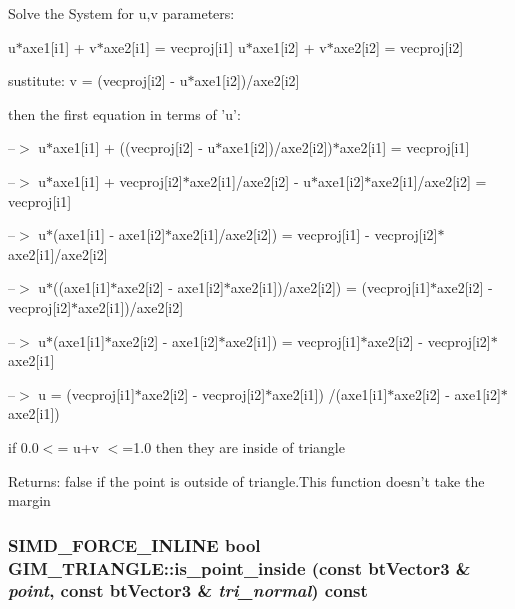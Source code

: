 Solve the System for u,v parameters:

u$\ast$axe1\mbox{[}i1\mbox{]} + v$\ast$axe2\mbox{[}i1\mbox{]} = vecproj\mbox{[}i1\mbox{]} u$\ast$axe1\mbox{[}i2\mbox{]} + v$\ast$axe2\mbox{[}i2\mbox{]} = vecproj\mbox{[}i2\mbox{]}

sustitute: v = (vecproj\mbox{[}i2\mbox{]} - u$\ast$axe1\mbox{[}i2\mbox{]})/axe2\mbox{[}i2\mbox{]}

then the first equation in terms of 'u':

--$>$ u$\ast$axe1\mbox{[}i1\mbox{]} + ((vecproj\mbox{[}i2\mbox{]} - u$\ast$axe1\mbox{[}i2\mbox{]})/axe2\mbox{[}i2\mbox{]})$\ast$axe2\mbox{[}i1\mbox{]} = vecproj\mbox{[}i1\mbox{]}

--$>$ u$\ast$axe1\mbox{[}i1\mbox{]} + vecproj\mbox{[}i2\mbox{]}$\ast$axe2\mbox{[}i1\mbox{]}/axe2\mbox{[}i2\mbox{]} - u$\ast$axe1\mbox{[}i2\mbox{]}$\ast$axe2\mbox{[}i1\mbox{]}/axe2\mbox{[}i2\mbox{]} = vecproj\mbox{[}i1\mbox{]}

--$>$ u$\ast$(axe1\mbox{[}i1\mbox{]} - axe1\mbox{[}i2\mbox{]}$\ast$axe2\mbox{[}i1\mbox{]}/axe2\mbox{[}i2\mbox{]}) = vecproj\mbox{[}i1\mbox{]} - vecproj\mbox{[}i2\mbox{]}$\ast$axe2\mbox{[}i1\mbox{]}/axe2\mbox{[}i2\mbox{]}

--$>$ u$\ast$((axe1\mbox{[}i1\mbox{]}$\ast$axe2\mbox{[}i2\mbox{]} - axe1\mbox{[}i2\mbox{]}$\ast$axe2\mbox{[}i1\mbox{]})/axe2\mbox{[}i2\mbox{]}) = (vecproj\mbox{[}i1\mbox{]}$\ast$axe2\mbox{[}i2\mbox{]} - vecproj\mbox{[}i2\mbox{]}$\ast$axe2\mbox{[}i1\mbox{]})/axe2\mbox{[}i2\mbox{]}

--$>$ u$\ast$(axe1\mbox{[}i1\mbox{]}$\ast$axe2\mbox{[}i2\mbox{]} - axe1\mbox{[}i2\mbox{]}$\ast$axe2\mbox{[}i1\mbox{]}) = vecproj\mbox{[}i1\mbox{]}$\ast$axe2\mbox{[}i2\mbox{]} - vecproj\mbox{[}i2\mbox{]}$\ast$axe2\mbox{[}i1\mbox{]}

--$>$ u = (vecproj\mbox{[}i1\mbox{]}$\ast$axe2\mbox{[}i2\mbox{]} - vecproj\mbox{[}i2\mbox{]}$\ast$axe2\mbox{[}i1\mbox{]}) /(axe1\mbox{[}i1\mbox{]}$\ast$axe2\mbox{[}i2\mbox{]} - axe1\mbox{[}i2\mbox{]}$\ast$axe2\mbox{[}i1\mbox{]})

if 0.0$<$= u+v $<$=1.0 then they are inside of triangle

\begin{Desc}
\item[Returns:]false if the point is outside of triangle.This function doesn't take the margin \end{Desc}
\hypertarget{class_g_i_m___t_r_i_a_n_g_l_e_921acb2a97263653fce72384f177a953}{
\subsubsection[is\_\-point\_\-inside]{\setlength{\rightskip}{0pt plus 5cm}SIMD\_\-FORCE\_\-INLINE bool GIM\_\-TRIANGLE::is\_\-point\_\-inside (const btVector3 \& {\em point}, \/  const btVector3 \& {\em tri\_\-normal}) const}}
\label{class_g_i_m___t_r_i_a_n_g_l_e_921acb2a97263653fce72384f177a953}


